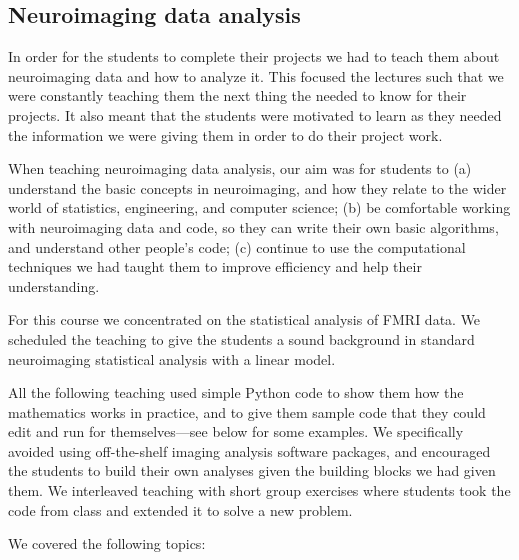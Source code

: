 
%
\subsection{Neuroimaging data analysis}\label{analysis}

In order for the students to complete their projects we had to
teach them about neuroimaging data and how to analyze it.
This focused the lectures such that we were constantly teaching
them the next thing the needed to know for their projects.
It also meant that the students were motivated to learn as
they needed the information we were giving them in order
to do their project work.

When teaching neuroimaging data analysis, our aim was for students to
(a) understand the basic concepts in neuroimaging,
and how they relate to the wider world of statistics, engineering, and computer science;
(b) be comfortable working with neuroimaging data and code, so they can write
their own basic algorithms, and understand other people's code;
(c) continue to use the computational techniques we had taught them to improve
efficiency and help their understanding.

For this course we concentrated on the statistical analysis of FMRI data.  We
scheduled the teaching to give the students a sound background in standard
neuroimaging statistical analysis with a linear model.

All the following teaching used simple Python code to show them how the
mathematics works in practice, and to give them sample code that they could
edit and run for themselves---see below for some examples.  We specifically
avoided using off-the-shelf imaging analysis software packages, and encouraged
the students to build their own analyses given the building blocks we had
given them.  We interleaved teaching with short group exercises where students
took the code from class and extended it to solve a new problem.

We covered the following topics:

